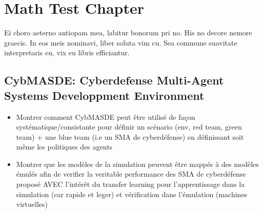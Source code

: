 \chapter{Math Test Chapter}\label{ch:mathtest} %
Ei choro aeterno antiopam mea, labitur bonorum pri no. His no decore
nemore graecis. In eos meis nominavi, liber soluta vim cu. Sea commune
suavitate interpretaris eu, vix eu libris efficiantur.

\section{CybMASDE: Cyberdefense Multi-Agent Systems Developpment Environment}
\begin{itemize}

    \item Montrer comment CybMASDE peut être utilisé de façon systématique/consistante pour définir un scénario (env, red team, green team) + une blue team (i.e un SMA de cyberdéfense) en définissant soit même les politiques des agents
    \item Montrer que les modèles de la simulation peuvent être mappés à des modèles émulés afin de verifier la veritable performance des SMA de cyberdéfense proposé AVEC l'intérêt du transfer learning pour l’apprentissage dans la simulation (car rapide et leger) et vérification dans l’émulation (machines virtuelles)
\end{itemize}
